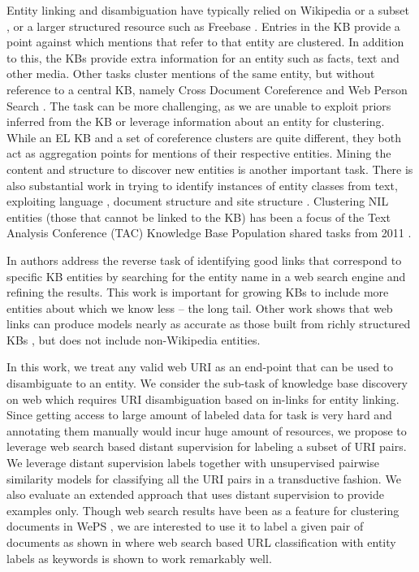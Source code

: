 \documentclass{sig-alternate-05-2015}
\begin{document}
Entity linking and disambiguation have typically relied on Wikipedia \cite{cucerzan2007large, milne2008learning} or a subset \cite{mcnamee2009overview}, or a larger structured resource such as Freebase \cite{zheng2012entity}. Entries in the KB provide a point against which mentions that refer to that entity are clustered. In addition to this, the KBs provide extra information for an entity such as facts, text and other media. Other tasks cluster mentions of the same entity, but without reference to a central KB, namely Cross Document Coreference \cite{bagga1998entity, singh2011large} and Web Person Search \cite{artiles2007semeval}. The task can be more challenging, as we are unable to exploit priors inferred from the KB or leverage information about an entity for clustering.
While an EL KB and a set of coreference clusters are quite different, they both act as aggregation points for mentions of their respective entities.
Mining the content and structure to discover new entities is another important task. There is also substantial work in trying to identify instances of entity
classes from text, exploiting language \cite{hearst1992automatic}, document structure \cite{wang2007language, bing2016distant} and site structure \cite{yang2010reconstruct}. Clustering NIL entities (those that cannot be linked to the KB) has been a focus of the Text Analysis Conference (TAC) Knowledge Base Population
shared tasks from 2011 \cite{heng2011overview}. 

In \cite{hachenbergfinding} authors address the reverse task of identifying good links that correspond to specific KB entities by searching for the entity name in a web search engine and refining the results. This work is important for growing KBs to include more entities about which we know less -- the long
tail. Other work shows that web links can produce models nearly as accurate as those built from richly structured KBs \cite{chisholm2016akbc}, but
does not include non-Wikipedia entities. 

In this work, we treat any valid web URI as an end-point that can be used to disambiguate to an entity. We consider the sub-task of knowledge base discovery on web which requires URI disambiguation based on in-links for entity linking. Since getting access to large amount of labeled data for task is very hard and annotating them manually would incur huge amount of resources, we propose to leverage web search based distant supervision for labeling a subset of URI pairs. We leverage distant supervision labels together with unsupervised pairwise similarity models for classifying all the URI pairs in a transductive fashion. We also evaluate an extended approach that uses distant supervision to provide examples only. Though web search results have been as a feature for clustering documents in WePS \cite{nuray2009exploiting}, we are interested to use it to label a given pair of documents as shown in \cite{hachenbergfinding} where web search based URL classification with entity labels as keywords is shown to work remarkably well. 
\end{document}
